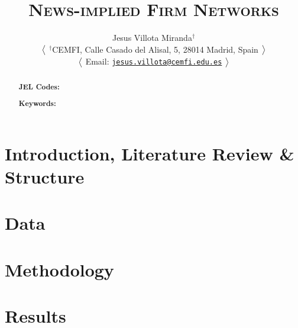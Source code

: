 \documentclass[12pt,a4paper]{article}
\title{\textsc{
{\LARGE News-implied Firm Networks}
}}
\author[1]{
{ \bx \bx \bx Jesus Villota Miranda$^{\dagger}$
}

\bx 
{\small
$\big{<}$
\noindent $^{\dagger}$CEMFI, Calle Casado del Alisal, 5, 28014 Madrid, Spain 
$\big{>}$

$\big{<}$
Email: \href{jesus.villota@cemfi.edu.es}{\texttt{jesus.villota@cemfi.edu.es}}
$\big{>}$
}
}
\date{}  %
\begin{document}
\maketitle
\thispagestyle{empty}  %


\begin{abstract}
%

\bigskip
\noindent\textbf{JEL Codes:} 

\noindent\textbf{Keywords:}
\end{abstract}


\newpage
\tableofcontents
\thispagestyle{empty}  %

\newpage
\setcounter{page}{1}
\section{Introduction, Literature Review \& Structure}
%
%
%

\section{Data}
%



\section{Methodology}



\section{Results}
\end{document}
